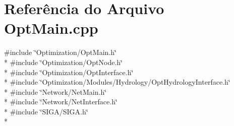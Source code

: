 \section{Referência do Arquivo Opt\+Main.\+cpp}
\label{_opt_main_8cpp}
{\ttfamily \#include \char`\"{}Optimization/\+Opt\+Main.\+h\char`\"{}}\\*
{\ttfamily \#include \char`\"{}Optimization/\+Opt\+Node.\+h\char`\"{}}\\*
{\ttfamily \#include \char`\"{}Optimization/\+Opt\+Interface.\+h\char`\"{}}\\*
{\ttfamily \#include \char`\"{}Optimization/\+Modules/\+Hydrology/\+Opt\+Hydrology\+Interface.\+h\char`\"{}}\\*
{\ttfamily \#include \char`\"{}Network/\+Net\+Main.\+h\char`\"{}}\\*
{\ttfamily \#include \char`\"{}Network/\+Net\+Interface.\+h\char`\"{}}\\*
{\ttfamily \#include \char`\"{}S\+I\+G\+A/\+S\+I\+G\+A.\+h\char`\"{}}\\*
